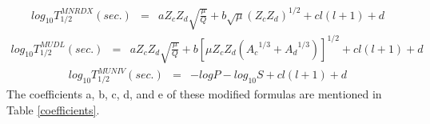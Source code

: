 \documentclass[preprint,10pt]{elsarticle}
\begin{document}
    \begin{eqnarray}
    log_{10}T_{1/2}^{MNRDX}(sec.) &=& aZ_{c}Z_{d}\sqrt{\frac{\mu}{Q}} + b\sqrt{\mu}(Z_{c}Z_{d})^{1/2} + cl(l+1) + d
     \label{eqmnrdx}
     \end{eqnarray}
    \begin{eqnarray}
    log_{10}T_{1/2}^{MUDL}(sec.) &=& aZ_{c}Z_{d}\sqrt{\frac{\mu}{Q}}+b[\mu Z_{c}Z_{d}({A_{c}}^{1/3} + {A_{d}}^{1/3})]^{1/2}+cl(l+1) + d
\label{mudl}
\end{eqnarray}
   \begin{eqnarray}
     log_{10}T_{1/2}^{MUNIV}(sec.) &=& -logP - log_{10}S + cl(l+1) +d
     \label{equniv}
     \end{eqnarray}
      The coefficients a, b, c, d, and e of these modified formulas are mentioned in Table \ref{coefficients}.
 \begin{table}[!htbp]
\caption{The coefficients of MBKAG, MRenA, MHoroi, MNRDX, MUDL, and MUNIV formulas proposed in the present work.}
\centering
\def\arraystretch{0.6}
\resizebox{0.6\textwidth}{!}{%
{\begin{tabular}{c|ccccccccc}
 \hline
\multicolumn{1}{c|}{Formula}&
\multicolumn{1}{c}{$a$}&
\multicolumn{1}{c}{}&
 \multicolumn{1}{c}{$b$}&
 \multicolumn{1}{c}{}&
\multicolumn{1}{c}{$c$}&
\multicolumn{1}{c}{}&
\multicolumn{1}{c}{$d$}&
\multicolumn{1}{c}{}&
\multicolumn{1}{c}{$e$}\\
 \hline
MBKAG & 6.5279 &&89.2684  &&0.0798&&70.0439 &&-100.4122 \\
MRenA & 1.2947 &&-0.0423  &&0.0771&&89.9255 &&-101.5076 \\
MHoroi& 10.1451&&-23.1954 &&4.4835&&-10.9094&&0.0567\\

MNRDX & 0.3590 &&-1.0063  &&0.0634&&-18.8444&&-\\
MUDL  & 0.3564 &&-0.3199  &&0.0737&&-24.8301&&-\\
MUNIV & 0.2369 &&0.6104   &&0.0648&&-23.7267&&-  \\

\hline
\end{tabular}}}
\label{coefficients}
\end{table}
\end{document}
